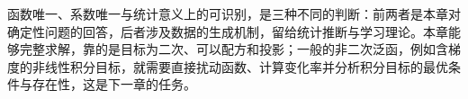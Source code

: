 函数唯一、系数唯一与统计意义上的可识别，是三种不同的判断：前两者是本章对确定性问题的回答，后者涉及数据的生成机制，留给统计推断与学习理论。本章能够完整求解，靠的是目标为二次、可以配方和投影；一般的非二次泛函，例如含梯度的非线性积分目标，就需要直接扰动函数、计算变化率并分析积分目标的最优条件与存在性，这是下一章的任务。

